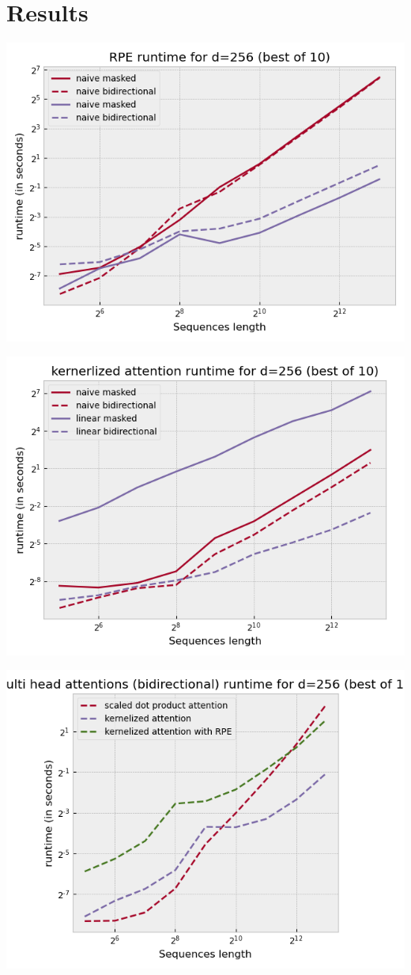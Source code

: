 \section{Results}

\includegraphics[width=0.9\linewidth]{images/runtimes_RPE.png}

\includegraphics[width=0.9\linewidth]{images/runtimes_KA.png}

\includegraphics[width=0.9\linewidth]{images/runtimes_MHA.png}

\endinput
